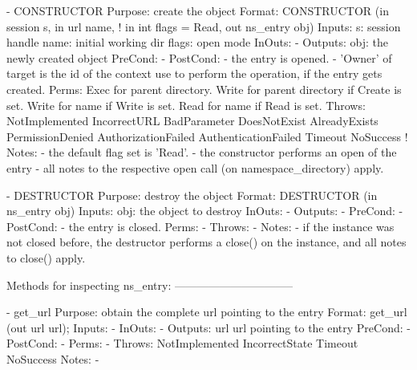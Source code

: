 
 \begin{myspec}
    - CONSTRUCTOR
      Purpose:  create the object
      Format:   CONSTRUCTOR          (in  session   s, 
                                      in  url       name,
!                                     in  int       flags = Read,
                                      out ns_entry obj)
      Inputs:   s:                    session handle
                name:                 initial working dir
                flags:                open mode
      InOuts:   -
      Outputs:  obj:                  the newly created object
      PreCond:  -
      PostCond: - the entry is opened.
                - 'Owner' of target is the id of the context
                  use to perform the operation, if the entry 
                  gets created.
      Perms:    Exec  for parent directory.
                Write for parent directory if Create is set.
                Write for name if Write is set.
                Read  for name if Read  is set.
      Throws:   NotImplemented
                IncorrectURL
                BadParameter
                DoesNotExist
                AlreadyExists
                PermissionDenied
                AuthorizationFailed
                AuthenticationFailed
                Timeout
                NoSuccess
!     Notes:    - the default flag set is 'Read'.
                - the constructor performs an open of the 
                  entry - all notes to the respective open 
                  call (on namespace_directory) apply.
 
 
    - DESTRUCTOR
      Purpose:  destroy the object
      Format:   DESTRUCTOR           (in  ns_entry     obj)
      Inputs:   obj:                  the object to destroy
      InOuts:   -
      Outputs:  -
      PreCond:  -
      PostCond: - the entry is closed.
      Perms:    -
      Throws:   - 
      Notes:    - if the instance was not closed before, the 
                  destructor performs a close() on the instance,
                  and all notes to close() apply.
 
 
 
    Methods for inspecting ns_entry:
    --------------------------------
 
    - get_url
      Purpose:  obtain the complete url pointing to the entry
      Format:   get_url            (out  url       url);
      Inputs:   -
      InOuts:   -
      Outputs:  url                 url pointing to the entry
      PreCond:  -
      PostCond: -
      Perms:    -
      Throws:   NotImplemented
                IncorrectState
                Timeout
                NoSuccess
      Notes:    -
 

\end{myspec}
